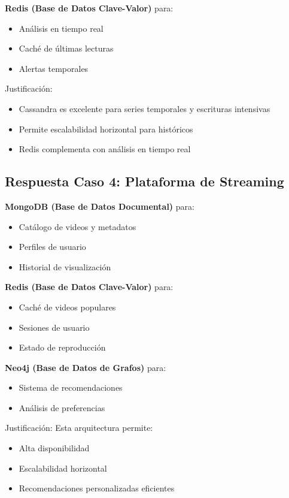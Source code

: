 \documentclass[12pt]{article}
\begin{document}
\textbf{Redis (Base de Datos Clave-Valor)} para:
\begin{itemize}
    \item Análisis en tiempo real
    \item Caché de últimas lecturas
    \item Alertas temporales
\end{itemize}

Justificación:
\begin{itemize}
    \item Cassandra es excelente para series temporales y escrituras intensivas
    \item Permite escalabilidad horizontal para históricos
    \item Redis complementa con análisis en tiempo real
\end{itemize}

\subsection{Respuesta Caso 4: Plataforma de Streaming}

\textbf{MongoDB (Base de Datos Documental)} para:
\begin{itemize}
    \item Catálogo de videos y metadatos
    \item Perfiles de usuario
    \item Historial de visualización
\end{itemize}

\textbf{Redis (Base de Datos Clave-Valor)} para:
\begin{itemize}
    \item Caché de videos populares
    \item Sesiones de usuario
    \item Estado de reproducción
\end{itemize}

\textbf{Neo4j (Base de Datos de Grafos)} para:
\begin{itemize}
    \item Sistema de recomendaciones
    \item Análisis de preferencias
\end{itemize}

Justificación: Esta arquitectura permite:
\begin{itemize}
    \item Alta disponibilidad
    \item Escalabilidad horizontal
    \item Recomendaciones personalizadas eficientes
\end{itemize}
\end{document}
